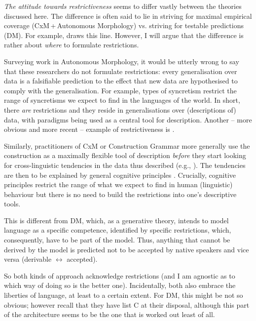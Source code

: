 \documentclass[output=paper]{langsci/langscibook}
\begin{document}
\textit{The attitude towards restrictiveness} seems to differ vastly between the theories discussed here. The difference is often said to lie in striving for maximal empirical coverage (CxM\,+\,Autonomous Morphology) vs. striving for testable predictions (DM). For example, \citet{Kramer2016} draws this line. However, I will argue that the difference is rather about \textit{where} to formulate restrictions.\largerpage

Surveying work in Autonomous Morphology, it would be utterly wrong to say that these researchers do not formulate restrictions: every generalisation over data is a falsifiable prediction to the effect that new data are hypothesised to comply with the generalisation. For example,  types of syncretism restrict the range of syncretisms we expect to find in the languages of the world. In short, there \textit{are} restrictions and they reside in generalisations over (descriptions of) data, with paradigms being used as a central tool for description. Another – more obvious and more recent – example of restrictiveness is \citet{Herce2019}.

Similarly, practitioners of CxM or Construction Grammar more generally use the construction as a maximally flexible tool of description \textit{before} they start looking for cross-linguistic tendencies in the data thus described (e.g., \citealt[Ch. 7–9]{Goldberg2006}). The tendencies are then to be explained by general cognitive principles \citep{Goldberg2006}. Crucially, cognitive principles restrict the range of what we expect to find in human (linguistic) behaviour but there is no need to build the restrictions into one’s descriptive tools.

This is different from DM, which, as a generative theory, intends to model language as a specific competence, identified by specific restrictions, which, consequently, have to be part of the model. Thus, anything that cannot be derived by the model is predicted not to be accepted by native speakers and vice versa (derivable $\leftrightarrow $ accepted).

So both kinds of approach acknowledge restrictions (and I am agnostic as to which way of doing so is the better one). Incidentally, both also embrace the liberties of language, at least to a certain extent. For DM, this might be not so obvious; however recall that they have list C at their disposal, although this part of the architecture seems to be the one that is worked out least of all.
\end{document}
